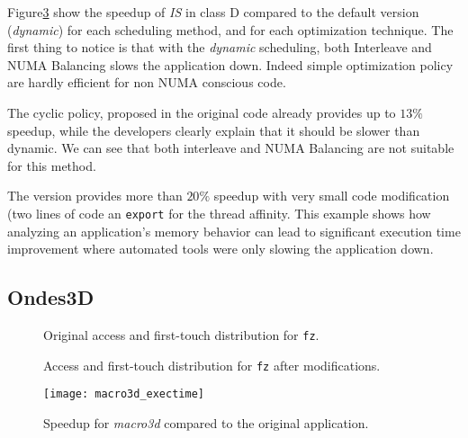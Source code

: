 Figure\ref{fig:is-res} show the speedup of \emph{IS} in class D compared to
the default version (\emph{dynamic}) for each scheduling method, and for each
optimization technique. The first thing to notice is that with the
\emph{dynamic} scheduling, both Interleave and NUMA Balancing slows
the application down. Indeed simple optimization policy are hardly efficient
for non NUMA conscious code.

The cyclic policy, proposed in the original code already provides up to $13\%$
speedup, while the developers clearly explain that it should be slower than
dynamic. We can see that both interleave and NUMA Balancing are not suitable
for this method.

The \TABARNAC version provides more than $20\%$ speedup with very small code
modification (two lines of code an \texttt{export} for the thread affinity.
This example shows how analyzing an application's memory behavior can lead to
significant execution time improvement where automated tools were only slowing
the application down.

\subsection{Ondes3D}
\label{sec:exp-macro3d}


\begin{figure}[htb]
    \centering

    \caption{Original access and first-touch distribution for \texttt{fz}.}
    \label{fig:macro3d-orig}
\end{figure}

\begin{figure}[htb]
    \centering

    \caption{Access and first-touch distribution for \texttt{fz} after modifications.}
    \label{fig:macro3d-modif}
\end{figure}

\begin{figure}[htpb]
    \centering
    \texttt{[image: macro3d\_exectime]}
    \caption{Speedup for \emph{macro3d} compared to the original application.}
\label{fig:is-res}
\end{figure}

